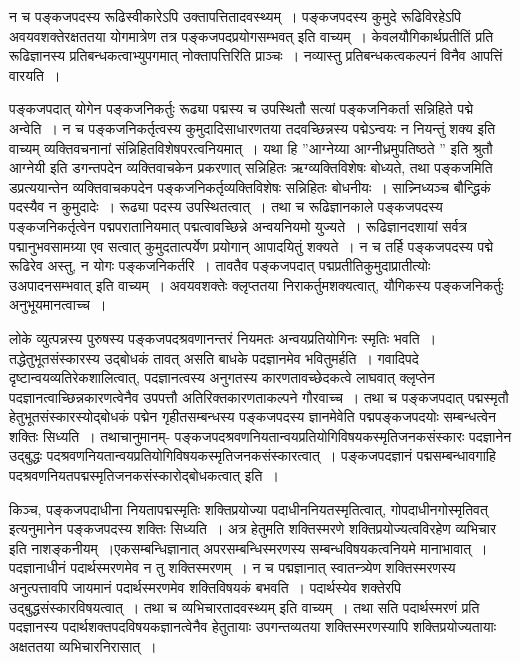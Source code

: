 			न च पङ्कजपदस्य रूढिस्वीकारेऽपि उक्तापत्तितादवस्थ्यम्~।  पङ्कजपदस्य कुमुदे रूढिविरहेऽपि  अवयवशक्तेरक्षततया योगमात्रेण तत्र पङ्कजपदप्रयोगसम्भवत् इति वाच्यम्~।  केवलयौगिकार्थप्रतीतिं प्रति रूढिज्ञानस्य प्रतिबन्धकत्वाभ्युपगमात् नोक्तापत्तिरिति प्राञ्चः~।  नव्यास्तु प्रतिबन्धकत्वकल्पनं विनैव आपत्तिं वारयति~।

			पङ्कजपदात् योगेन पङ्कजनिकर्तुः रूढ्या पद्मस्य च उपस्थितौ सत्यां पङ्कजनिकर्ता सन्निहिते पद्मे अन्वेति~। न च पङ्कजनिकर्तृत्वस्य कुमुदादिसाधारणतया तदवच्छिन्नस्य पद्मेऽन्वयः न नियन्तुं शक्य इति वाच्यम् व्यक्तिवचनानां संन्निहितविशेषपरत्वनियमात्~।  यथा हि ”आग्नेय्या आग्नीध्रमुपतिष्ठते ” इति श्रुतौ आग्नेयी इति डगन्तपदेन व्यक्तिवाचकेन प्रकरणात् सन्निहितः ऋग्व्यक्तिविशेषः बोध्यते, तथा पङ्कजमिति डप्रत्ययान्तेन व्यक्तिवाचकपदेन पङ्कजनिकर्तृव्यक्तिविशेषः सन्निहितः बोधनीयः~।  सान्न्निध्यञ्च बौन्द्धिकं पदस्यैव न कुमुदादेः~।  रूढ्या पदस्य उपस्थितत्वात्~।  तथा च रूढिज्ञानकाले पङ्कजपदस्य पङ्कजनिकर्तृत्वेन पद्मपरातानियमात् पद्मत्वावच्छिन्ने अन्वयनियमो युज्यते~।  रूढिज्ञानदशायां सर्वत्र पद्मानुभवसामग्र्या एव सत्वात् कुमुदतात्पर्येण प्रयोगान् आपादयितुं शक्यते~।  न च तर्हि पङ्कजपदस्य पद्मे रूढिरेव अस्तु, न योगः पङ्कजनिकर्तरि~।  तावतैव पङ्कजपदात् पद्मप्रतीतिकुमुदाप्रातीत्योः उअपादनसम्भवात् इति वाच्यम्~।  अवयवशक्तेः क्लृप्ततया निराकर्तुमशक्यत्वात्, यौगिकस्य पङ्कजनिकर्तुः अनुभूयमानत्वाच्च~। 
		
			लोके व्युत्पन्नस्य पुरुषस्य पङ्कजपदश्रवणानन्तरं नियमतः अन्वयप्रतियोगिनः स्मृतिः भवति~। तद्धेतुभूतसंस्कारस्य उद्बोधकं तावत् असति बाधके पदज्ञानमेव भवितुमर्हति~।  गवादिपदे दृष्टान्वयव्यतिरेकशालित्वात्, पदज्ञानत्वस्य अनुगतस्य कारणतावच्छेदकत्वे  लाघवात् क्लृप्तेन पदज्ञानत्वाच्छिन्नकारणत्वेनैव उपपत्तौ अतिरिक्तकारणताकल्पने गौरवाच्च~।  तथा च पङ्कजपदात् पद्मस्मृतौ हेतुभूतसंस्कारस्योद्बोधकं  पद्मेन गृहीतसम्बन्धस्य पङ्कजपदस्य ज्ञानमेवेति पद्मपङ्कजपदयोः सम्बन्धत्वेन शक्तिः सिध्यति~।  तथाचानुमानम्- पङ्कजपदश्रवणनियतान्वयप्रतियोगिविषयकस्मृतिजनकसंस्कारः पदज्ञानेन उद्बुद्धः पदश्रवणनियतान्वयप्रतियोगिविषयकस्मृतिजनकसंस्कारत्वात्~। पङ्कजपदज्ञानं पद्मसम्बन्धावगाहि पदश्रवणनियतपद्मस्मृतिजनकसंस्कारोद्बोधकत्वात् इति~। 

			किञ्च, पङ्कजपदाधीना नियतापद्मस्मृतिः शक्तिप्रयोज्या पदाधीननियतस्मृतित्वात्, गोपदाधीनगोस्मृतिवत् इत्यनुमानेन पङ्कजपदस्य  शक्तिः सिध्यति~। अत्र हेतुमति शक्तिस्मरणे शक्तिप्रयोज्यत्वविरहेण व्यभिचार इति नाशङ्कनीयम्~।एकसम्बन्धिज्ञानात्  अपरसम्बन्धिस्मरणस्य सम्बन्धविषयकत्वनियमे मानाभावात्~।पदज्ञानाधीनं पदार्थस्मरणमेव न तु शक्तिस्मरणम्~। न च पद्मज्ञानात् स्वातन्त्र्येण शक्तिस्मरणस्य अनुत्पत्तावपि जायमानं पदार्थस्मरणमेव  शक्तिविषयकं बभवति~। पदार्थस्येव शक्तेरपि उद्बुद्धसंस्कारविषयत्वात्~। तथा च व्यभिचारतादवस्थ्यम् इति वाच्यम्~। तथा सति पदार्थस्मरणं प्रति  पदज्ञानस्य पदार्थशक्तपदविषयकज्ञानत्वेनैव हेतुतायाः उपगन्तव्यतया शक्तिस्मरणस्यापि  शक्तिप्रयोज्यतायाः अक्षततया व्यभिचारनिरासात्~।

